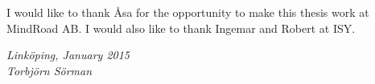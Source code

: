 \begin{acknowledgments}
	I would like to thank Åsa for the opportunity to make this thesis work at MindRoad AB. I would also like to thank Ingemar and Robert at ISY.

	\addvspace{1em}
	\begin{flushright}
    \textit{%
		Linköping, January 2015\\
		Torbjörn Sörman%
	}
	\end{flushright}
\end{acknowledgments}
